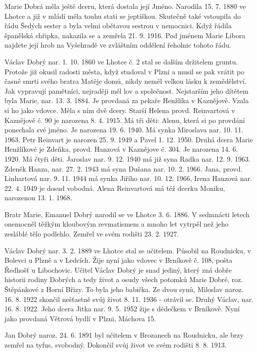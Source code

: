 \documentclass[../dejiny-rodu-prusiku.tex]{subfiles}
\begin{document}
Marie Dobrá měla ještě dceru, která dostala její Jméno. Narodila 15. 7. 1880 ve Lhotce a již v mládí měla tou­hu stati se jeptiškou. Skutečně také vstoupila do řádu Šedých sester a byla velmi obětavou sestrou v nemocnici. Když řádila španělská chřipka, nakazila se a zemřela 21. 9. 1916. Pod jménem Marie Libora najdete její hrob na Vyšehradě ve zvláštním oddělení řeholnic tohoto řádu.

Václav Dobrý nar. 1. 10. 1860 ve Lhotce č. 2 stal se dal­ším držitelem gruntu. Protože již okusil radosti města, když studoval v Plzni a musil se pak vrátit po časné smrti svého bratra Matěje domů, nikdy neměl velkou lásku k zemědělství. Jak vypravují pamětníci, nejraději měl lov a společnost. Nejstarším jeho dítětem byla Marie, nar. 13. 3. 1884. Je provdaná za pekaře Henžlíka v Kaznějově. Vzala si ho jako vdovce. Měla s ním dvě dcery. Starší Helena provd. Reinvartová v Kaznějově č. 90 je narozena 8. 4. 1915. Má tři děti: Alenu, která si po pro­vdání ponechala své jméno.  Je narozena 19. 6. 1940. Má synka Miroslava nar. 10. 11. 1963. Petr Reinvart je naro­zen 25. 9. 1949 a Pavel 1. 12. 1950. Druhá dcera Marie Henžlíkové je Zdeňka, provd. Hanzová v Kaznějove č. 304. Je narozena 14. 6. 1920. Má čtyři děti. Jaroslav nar. 9. 12. 1940 má již syna Radka nar. 12. 9. 1963. Zdeněk Hanza, nar. 27. 2. 1943 má syna Dušana nar. 10. 2. 1966. Jana, provd. Linhartová nar. 9. 11. 1944 má synka Jiřího nar. 10. 12. 1966, Irena Hanzová nar. 22. 4. 1949 je dosud vobodná. Alena Reinvartová má též dcerku Moniku, narozenou 13. 1. 1968.

Bratr Marie, Emanuel Dobrý narodil se ve Lhotce 3. 6. 1886. V sedmnácti letech onemocněl těžkým kloubovým revmatismem a mnoho let vytrpěl než jeho zesláblé tělo podlehlo. Zemřel ve svém rodišti 23. 2. 1927.

Václav Dobrý nar. 3. 2. 1889 ve Lhotce stal se učitelem. Působil na Roudnicku, v Bolevci u Plzně a v Ledcích. Žije nyní jako vdovec v Brníkově č. 108, pošta Ředhošť u Libochovic. Učitel Václav Dobrý je snad jediný, který zná dobře historii rodiny Dobrých a tedy život a osudy všech potomků Marie Dobré, roz. Štěpánkové z Horní Břizy. To byla jeho babička. Ze dvou synů, Miloslav naroz. 16. 8. 1922 skončil nešťastně svůj život 8. 11. 1936 - otrávil se. Druhý Václav, nar. 16. 8. 1922. Jeho dcera Jitka nar. 9. 5. 1952 žije s dědečkem v Brníkově. Nyní jako provdaná Větrová bydlí v Plzni, Máchova 15.

Jan Dobrý naroz. 24. 6. 1891 byl učitelem v Brozanech na Roudnicku, ale brzy zemřel na tyfus, svobodný. Dokončil svůj život ve svém rodišti 8. 8. 1913.
\end{document}
